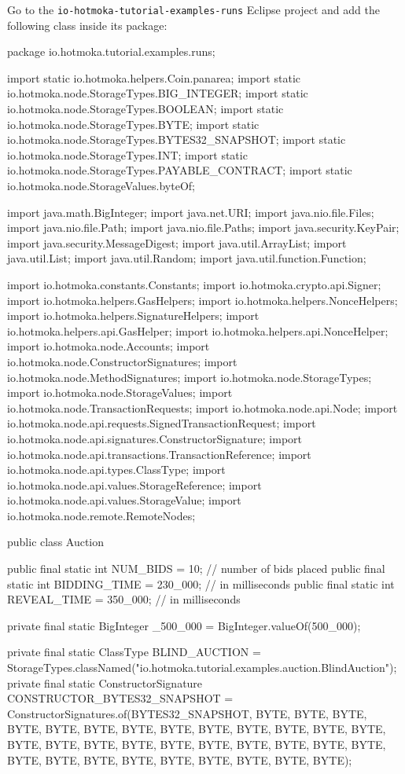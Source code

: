 Go to the \texttt{io-hotmoka-tutorial-examples-runs} Eclipse project and add the following
class inside its package:
%
\begin{codebox}\begin{javalst}
package io.hotmoka.tutorial.examples.runs;

import static io.hotmoka.helpers.Coin.panarea;
import static io.hotmoka.node.StorageTypes.BIG_INTEGER;
import static io.hotmoka.node.StorageTypes.BOOLEAN;
import static io.hotmoka.node.StorageTypes.BYTE;
import static io.hotmoka.node.StorageTypes.BYTES32_SNAPSHOT;
import static io.hotmoka.node.StorageTypes.INT;
import static io.hotmoka.node.StorageTypes.PAYABLE_CONTRACT;
import static io.hotmoka.node.StorageValues.byteOf;

import java.math.BigInteger;
import java.net.URI;
import java.nio.file.Files;
import java.nio.file.Path;
import java.nio.file.Paths;
import java.security.KeyPair;
import java.security.MessageDigest;
import java.util.ArrayList;
import java.util.List;
import java.util.Random;
import java.util.function.Function;

import io.hotmoka.constants.Constants;
import io.hotmoka.crypto.api.Signer;
import io.hotmoka.helpers.GasHelpers;
import io.hotmoka.helpers.NonceHelpers;
import io.hotmoka.helpers.SignatureHelpers;
import io.hotmoka.helpers.api.GasHelper;
import io.hotmoka.helpers.api.NonceHelper;
import io.hotmoka.node.Accounts;
import io.hotmoka.node.ConstructorSignatures;
import io.hotmoka.node.MethodSignatures;
import io.hotmoka.node.StorageTypes;
import io.hotmoka.node.StorageValues;
import io.hotmoka.node.TransactionRequests;
import io.hotmoka.node.api.Node;
import io.hotmoka.node.api.requests.SignedTransactionRequest;
import io.hotmoka.node.api.signatures.ConstructorSignature;
import io.hotmoka.node.api.transactions.TransactionReference;
import io.hotmoka.node.api.types.ClassType;
import io.hotmoka.node.api.values.StorageReference;
import io.hotmoka.node.api.values.StorageValue;
import io.hotmoka.node.remote.RemoteNodes;

public class Auction {

  public final static int NUM_BIDS = 10; // number of bids placed
  public final static int BIDDING_TIME = 230_000; // in milliseconds
  public final static int REVEAL_TIME = 350_000; // in milliseconds

  private final static BigInteger _500_000 = BigInteger.valueOf(500_000);

  private final static ClassType BLIND_AUCTION
    = StorageTypes.classNamed("io.hotmoka.tutorial.examples.auction.BlindAuction");
  private final static ConstructorSignature CONSTRUCTOR_BYTES32_SNAPSHOT
    = ConstructorSignatures.of(BYTES32_SNAPSHOT,
      BYTE, BYTE, BYTE, BYTE, BYTE, BYTE, BYTE, BYTE,
      BYTE, BYTE, BYTE, BYTE, BYTE, BYTE, BYTE, BYTE,
      BYTE, BYTE, BYTE, BYTE, BYTE, BYTE, BYTE, BYTE,
      BYTE, BYTE, BYTE, BYTE, BYTE, BYTE, BYTE, BYTE);

}
\end{javalst}
\end{codebox}
